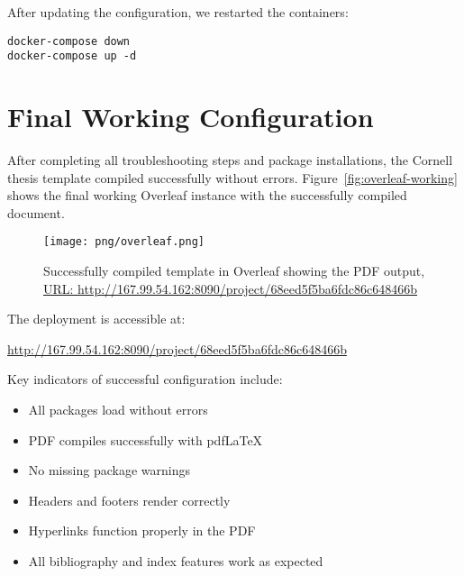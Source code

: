 After updating the configuration, we restarted the containers:

\begin{verbatim}
docker-compose down
docker-compose up -d
\end{verbatim}

\section{Final Working Configuration}

After completing all troubleshooting steps and package installations, the Cornell thesis template compiled successfully without errors. Figure~\ref{fig:overleaf-working} shows the final working Overleaf instance with the successfully compiled document.


\begin{figure}
    \centering
    \texttt{[image: png/overleaf.png]}
    \caption{Successfully compiled template in Overleaf showing the PDF output, \url{URL: http://167.99.54.162:8090/project/68eed5f5ba6fdc86c648466b}}
    \label{fig:placeholder}
\end{figure}


The deployment is accessible at:

\begin{center}
\url{http://167.99.54.162:8090/project/68eed5f5ba6fdc86c648466b}
\end{center}

Key indicators of successful configuration include:

\begin{itemize}
  \item All packages load without errors
  \item PDF compiles successfully with pdfLaTeX
  \item No missing package warnings
  \item Headers and footers render correctly
  \item Hyperlinks function properly in the PDF
  \item All bibliography and index features work as expected
\end{itemize}

